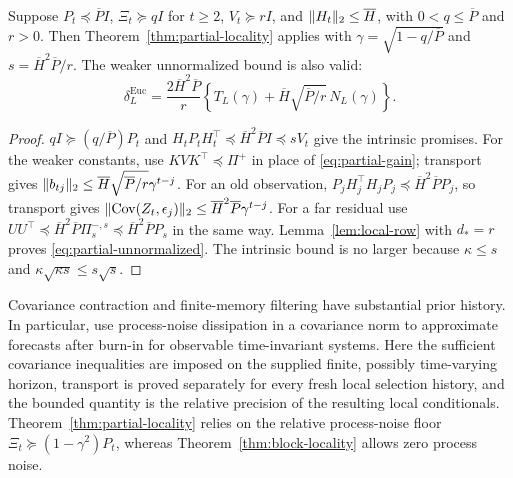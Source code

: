 \begin{corollary}
\label{cor:partial-euclidean}
Suppose $P_t\preceq\overline P I$, $\Xi_t\succeq qI$ for $t\ge2$,
$V_t\succeq rI$, and $\lVert H_t\rVert_2\le\overline H$, with
$0<q\le\overline P$ and $r>0$. Then
Theorem~\ref{thm:partial-locality} applies with
$\gamma=\sqrt{1-q/\overline P}$ and $s=\overline H^2\overline P/r$.
The weaker unnormalized bound is also valid:
\begin{equation}
 \delta_L^{\mathrm{Euc}}=
 \frac{2\overline H^2\overline P}{r}
 \left\{T_L(\gamma)+\overline H\sqrt{\overline P/r}\,N_L(\gamma)\right\}.
 \label{eq:partial-unnormalized}
\end{equation}
\end{corollary}
\begin{proof}
$qI\succeq(q/\overline P)P_t$ and
$H_tP_tH_t^\top\preceq\overline H^2\overline P I\preceq sV_t$
give the intrinsic promises. For the weaker constants, use
$KVK^\top\preceq\Pi^+$ in place of
\eqref{eq:partial-gain}; transport gives
$\lVert b_{tj}\rVert_2\le\overline H\sqrt{\overline P/r}\gamma^{t-j}$.
For an old observation, $P_jH_j^\top H_jP_j
\preceq\overline H^2\overline P P_j$, so transport gives
$\lVert\operatorname{Cov}(Z_t,\epsilon_j)\rVert_2
\le\overline H^2\overline P\gamma^{t-j}$.
For a far residual use
$UU^\top\preceq\overline H^2\overline P\Pi_s^{-,s}
\preceq\overline H^2\overline P P_s$ in the same way.
Lemma~\ref{lem:local-row} with $d_*=r$ proves
\eqref{eq:partial-unnormalized}. The intrinsic bound is no larger because
$\kappa\le s$ and $\kappa\sqrt{\kappa s}\le s\sqrt s$.
\end{proof}

Covariance contraction and finite-memory filtering have substantial prior
history. In particular, \citet[Theorems 1--2]{Kozdoba2019} use process-noise
dissipation in a covariance norm to approximate forecasts after burn-in for
observable time-invariant systems. Here the sufficient covariance inequalities
are imposed on the supplied finite, possibly time-varying horizon, transport
is proved separately for every fresh local selection history, and the bounded
quantity is the relative precision of the resulting local conditionals.
Theorem~\ref{thm:partial-locality} relies on the relative process-noise
floor $\Xi_t\succeq(1-\gamma^2)P_t$, whereas
Theorem~\ref{thm:block-locality} allows zero process noise.

